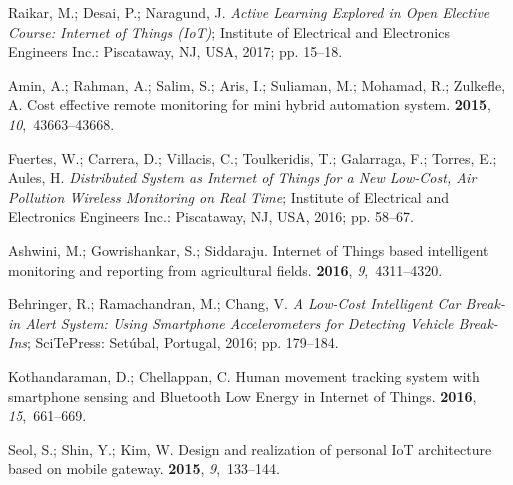 \documentclass[symmetry,article,accept,moreauthors,pdftex10pt,a4paper]{mdpi}
\begin{document}
\begin{thebibliography}{999}
Raikar, M.; Desai, P.; Naragund, J.
\newblock \emph{Active Learning Explored in Open Elective Course: Internet of Things
	(IoT)};
\newblock Institute of Electrical and Electronics Engineers Inc.: Piscataway, NJ, USA, 2017; pp.
15--18.

Amin, A.; Rahman, A.; Salim, S.; Aris, I.; Suliaman, M.; Mohamad, R.; Zulkefle,
A.
\newblock Cost effective remote monitoring for mini hybrid automation system.
 {\bf
	2015}, {\em 10},~43663--43668.

Fuertes, W.; Carrera, D.; Villacis, C.; Toulkeridis, T.; Galarraga, F.; Torres,
E.; Aules, H.
\newblock \emph{Distributed System as Internet of Things for a New Low-Cost, Air
	Pollution Wireless Monitoring on Real Time};
\newblock Institute of Electrical and Electronics Engineers Inc.: Piscataway, NJ, USA, 2016; pp.
58--67.

Ashwini, M.; Gowrishankar, S.; Siddaraju.
\newblock Internet of Things based intelligent monitoring and reporting from
agricultural fields.
 {\bf
	2016}, {\em 9},~4311--4320. %

Behringer, R.; Ramachandran, M.; Chang, V.
\newblock \emph{A Low-Cost Intelligent Car Break-in Alert System: Using Smartphone
	Accelerometers for Detecting Vehicle Break-Ins};
\newblock SciTePress: Setúbal, Portugal, 2016; pp. 179--184.

Kothandaraman, D.; Chellappan, C.
\newblock Human movement tracking system with smartphone sensing and Bluetooth
Low Energy in Internet of Things.
 {\bf 2016}, {\em
	15},~661--669.

Seol, S.; Shin, Y.; Kim, W.
\newblock Design and realization of personal IoT architecture based on mobile
gateway.
 {\bf 2015}, {\em
	9},~133--144.


\end{thebibliography}
\end{document}
